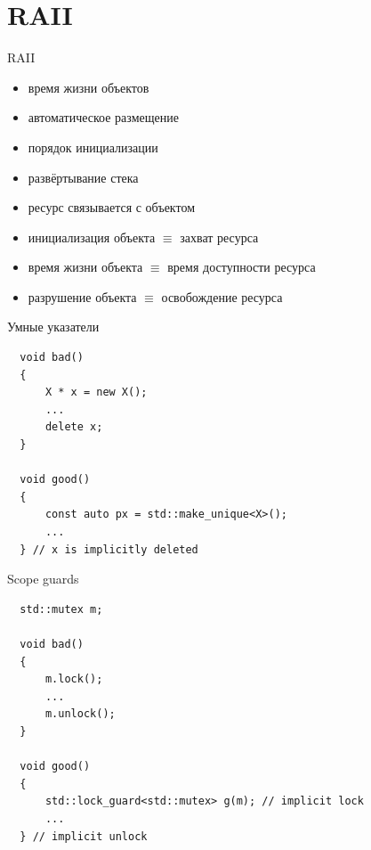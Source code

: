 \documentclass[unknownkeysallowed,xcolor=table]{beamer}
\begin{document}
\section{RAII}

\begin{frame}{RAII}
  \begin{itemize}
    \item время жизни объектов \vspace{0.5em}
    \item автоматическое размещение \vspace{0.5em}
    \item порядок инициализации \vspace{0.5em}
    \item развёртывание стека
  \end{itemize}

  \vspace{1em}

  \begin{itemize}
    \item ресурс связывается с объектом
    \item инициализация объекта $\equiv$ захват ресурса
    \item время жизни объекта $\equiv$ время доступности ресурса
    \item разрушение объекта $\equiv$ освобождение ресурса
  \end{itemize}
\end{frame}

\begin{frame}[fragile]{Умные указатели}
  \begin{lstlisting}
  void bad()
  {
      X * x = new X();
      ...
      delete x;
  }

  void good()
  {
      const auto px = std::make_unique<X>();
      ...
  } // x is implicitly deleted
  \end{lstlisting}
\end{frame}

\begin{frame}[fragile]{Scope guards}
  \begin{lstlisting}
  std::mutex m;

  void bad()
  {
      m.lock();
      ...
      m.unlock();
  }

  void good()
  {
      std::lock_guard<std::mutex> g(m); // implicit lock
      ...
  } // implicit unlock
  \end{lstlisting}
\end{frame}
\end{document}
